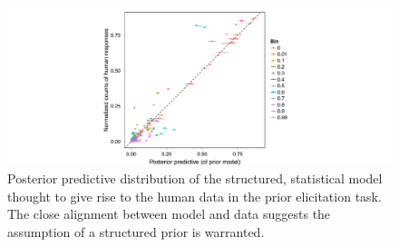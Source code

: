 \documentclass[12pt,letterpaper]{article}
\newcommand{\mht}[1]{\textcolor{Blue}{[mht: #1]}}
\begin{document}
\begin{figure}
\centering
    \includegraphics[width=0.6\columnwidth]{postPred-priorModel.pdf}
    \caption{Posterior predictive distribution of the structured, statistical model thought to give rise to the human data in the prior elicitation task. The close alignment between model and data suggests the assumption of a structured prior is warranted.}
  \label{fig:pp-priorModel}
\end{figure}


\end{document}
